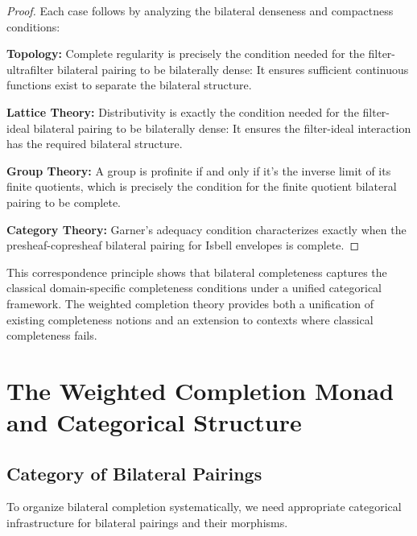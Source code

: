 \documentclass[11pt]{article}
\theoremstyle{plain}
\theoremstyle{definition}
\theoremstyle{remark}
\begin{document}
\begin{proof}
Each case follows by analyzing the bilateral denseness and compactness conditions:

\textbf{Topology:} Complete regularity is precisely the condition needed for the filter-ultrafilter bilateral pairing to be bilaterally dense: It ensures sufficient continuous functions exist to separate the bilateral structure.

\textbf{Lattice Theory:} Distributivity is exactly the condition needed for the filter-ideal bilateral pairing to be bilaterally dense: It ensures the filter-ideal interaction has the required bilateral structure.

\textbf{Group Theory:} A group is profinite if and only if it's the inverse limit of its finite quotients, which is precisely the condition for the finite quotient bilateral pairing to be complete.

\textbf{Category Theory:} Garner's adequacy condition characterizes exactly when the presheaf-copresheaf bilateral pairing for Isbell envelopes is complete.
\end{proof}

This correspondence principle shows that bilateral completeness captures the classical domain-specific completeness conditions under a unified categorical framework. The weighted completion theory provides both a unification of existing completeness notions and an extension to contexts where classical completeness fails.

\section{The Weighted Completion Monad and Categorical Structure}

\subsection{Category of Bilateral Pairings}

To organize bilateral completion systematically, we need appropriate categorical infrastructure for bilateral pairings and their morphisms.
\end{document}
